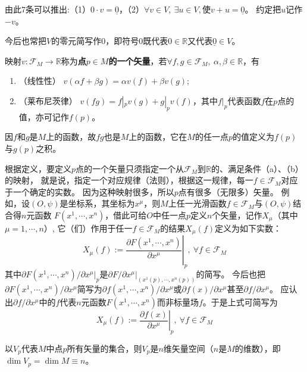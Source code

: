 \begin{note}
由此$7$条可以推出:（1）$0 \cdot v = \underline{0}$，（2）$\forall v \in V, ~ \exists u \in V, \text{使} v + u = \underline{0}$。
约定把$u$记作$-v$。
\end{note}

今后也常把$V$的零元简写作$0$，即符号$0$既代表$0 \in \mathbb{R}$又代表$\underline{0} \in V$。

\begin{definition}
映射$v \colon \mathscr{F}_M \to \mathbb{R}$称为\textbf{点$p \in M$的一个矢量}，若$\forall f, g \in \mathscr{F}_M, ~ \alpha, \beta \in \mathbb{R}$，有
\begin{enumerate}[（a）]
\item （线性性） $v(\alpha f + \beta g) = \alpha v(f) + \beta v(g)$;
\item （莱布尼茨律） $v(fg) = f|_p v(g) + g|_p v(f)$，其中$f|_p$代表函数$f$在$p$点的值，亦可记作$f(p)$。
\end{enumerate}
\end{definition}

\begin{note}
因$f$和$g$是$M$上的函数，故$fg$也是$M$上的函数，它在$M$的任一点$p$的值定义为$f(p)$与$g(p)$之积。
\end{note}

根据定义，要定义$p$点的一个矢量只须指定一个从$\mathscr{F}_M$到$\mathbb{R}$的、满足条件（a）、（b）的映射，
就是说，指定一个对应规律（法则），根据这一规律，每一$f \in \mathscr{F}_M$对应于一个确定的实数。
因为这种映射很多，所以$p$点有很多（无限多）矢量。
例如，设$(O, \psi)$是坐标系，其坐标为$x^\mu$，则$M$上任一光滑函数$f \in \mathscr{F}_M$与$(O, \psi)$结合得$n$元函数
$F(x^1, \cdots, x^n)$，借此可给$O$中任一点$p$定义$n$个矢量，记作$X_\mu$（其中$\mu = 1, \cdots, n$）,
它（们）作用于任一$f \in \mathscr{F}_M$的结果$X_\mu(f)$定义为如下实数：
$$X_\mu(f) := \left.\frac{\partial F(x^1, \cdots, x^n)}{\partial x^\mu}\right|_p, ~ \forall f \in \mathscr{F}_M$$
其中$\partial F(x^1, \cdots, x^n)/\partial x^\mu|_p$是$\partial F/\partial x^\mu|_{(x^1(p), \cdots, x^n(p))}$的简写。
今后也把$\partial F(x^1, \cdots, x^n)/\partial x^\mu$简写为$\partial f(x^1, \cdots, x^n)/\partial x^\mu$或$\partial f(x)/\partial x^\mu$甚至$\partial f/\partial x^\mu$。
应认出$\partial f/\partial x^\mu$中的$f$代表$n$元函数$F(x^1, \cdots, x^n)$而非标量场$f$。于是上式可简写为
$$X_\mu(f) := \left.\frac{\partial f(x)}{\partial x^\mu}\right|_p, ~ \forall f \in \mathscr{F}_M$$

\begin{theorem}
以$V_p$代表$M$中点$p$所有矢量的集合，则$V_p$是$n$维矢量空间（$n$是$M$的维数），即$\dim V_p = \dim M \equiv n$。
\end{theorem}

